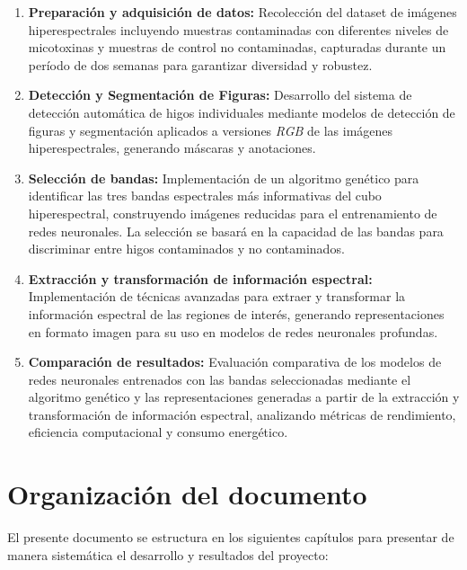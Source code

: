 \begin{enumerate}
    \item \textbf{Preparación y adquisición de datos:} Recolección del dataset de imágenes hiperespectrales incluyendo muestras contaminadas con diferentes niveles de micotoxinas y muestras de control no contaminadas, capturadas durante un período de dos semanas para garantizar diversidad y robustez.
    \item \textbf{Detección y Segmentación de Figuras:} Desarrollo del sistema de detección automática de higos individuales mediante modelos de detección de figuras y segmentación aplicados a versiones \emph{RGB} de las imágenes hiperespectrales, generando máscaras y anotaciones.
    \item \textbf{Selección de bandas:} Implementación de un algoritmo genético para identificar las tres bandas espectrales más informativas del cubo hiperespectral, construyendo imágenes reducidas para el entrenamiento de redes neuronales. La selección se basará en la capacidad de las bandas para discriminar entre higos contaminados y no contaminados.
    \item \textbf{Extracción y transformación de información espectral:} Implementación de técnicas avanzadas para extraer y transformar la información espectral de las regiones de interés, generando representaciones en formato imagen para su uso en modelos de redes neuronales profundas.
    \item \textbf{Comparación de resultados:} Evaluación comparativa de los modelos de redes neuronales entrenados con las bandas seleccionadas mediante el algoritmo genético y las representaciones generadas a partir de la extracción y transformación de información espectral, analizando métricas de rendimiento, eficiencia computacional y consumo energético.
\end{enumerate}

\section{Organización del documento}
El presente documento se estructura en los siguientes capítulos para presentar de manera sistemática el desarrollo y resultados del proyecto:


